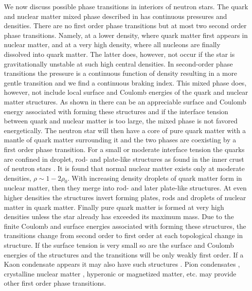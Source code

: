 \begin{multicols}{2}
We now discuss possible phase transitions in interiors of neutron
stars.  The quark and nuclear matter mixed phase described in
\cite{Glendenning} has continuous pressures and densities. There are
no first order phase transitions but at most two second order phase
transitions. Namely, at a lower density, where quark matter first
appears in nuclear matter, and at a very high density, where all
nucleons are finally dissolved into quark matter. The latter does,
however, not occur if the star is gravitationally unstable at such
high central densities.  In second-order
phase transitions the pressure is a continuous function of density
resulting in a more gentle transition and we find a continuous braking
index.  This mixed phase does, however, not include local surface and
Coulomb energies of the quark and nuclear matter structures. As shown
in \cite{HPS,HH} there can be an appreciable surface and Coulomb
energy associated with forming these structures and if the interface
tension between quark and nuclear matter is too large, the mixed phase
is not favored energetically. The neutron star will then have a core
of pure quark matter with a mantle of quark matter surrounding it and
the two phases are coexisting by a first order phase transition.  For
a small or moderate interface tension the quarks are confined in
droplet, rod- and plate-like structures \cite{HPS,HH} as found in the
inner crust of neutron stars \cite{LPR}. It is found that normal
nuclear matter exists only at moderate densities, $\rho\sim
1-2\rho_0$.  With increasing density droplets of quark matter form in
nuclear matter, then they merge into rod- and later plate-like
structures.  At even higher densities the structures invert forming
plates, rods and droplets of nuclear matter in quark matter.  Finally
pure quark matter is formed at very high densities unless the star
already has exceeded its maximum mass.  Due to the finite Coulomb and
surface energies associated with forming these structures, the
transitions change from second order to first order at each
topological change in structure.  If the surface tension is very small
so are the surface and Coulomb energies of the structures and the
transitions will be only weakly first order.  If a Kaon condensate
appears it may also have such structures \cite{Schaffner}.
Pion condensates \cite{pion}, crystalline nuclear matter \cite{vijay},
hyperonic or magnetized matter, etc. may provide
other first order phase transitions.


\end{multicols}
